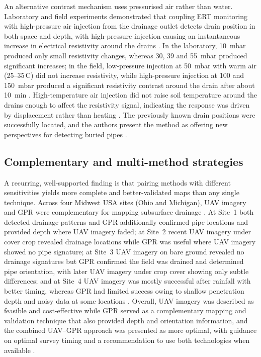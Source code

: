 An alternative contrast mechanism uses pressurised air rather than water. Laboratory and field experiments demonstrated that coupling ERT monitoring with high-pressure air injection from the drainage outlet detects drain position in both space and depth, with high-pressure injection causing an instantaneous increase in electrical resistivity around the drains \parencite{Henine2021}. In the laboratory, 10~mbar produced only small resistivity changes, whereas 30, 39 and 55~mbar produced significant increases; in the field, low-pressure injection at 50~mbar with warm air (25--35\,\textdegree C) did not increase resistivity, while high-pressure injection at 100 and 150~mbar produced a significant resistivity contrast around the drain after about 10~min \parencite{Henine2021}. High-temperature air injection did not raise soil temperature around the drains enough to affect the resistivity signal, indicating the response was driven by displacement rather than heating \parencite{Henine2021}. The previously known drain positions were successfully located, and the authors present the method as offering new perspectives for detecting buried pipes \parencite{Henine2021}.

\subsection{Complementary and multi-method strategies}

A recurring, well-supported finding is that pairing methods with different sensitivities yields more complete and better-validated maps than any single technique. Across four Midwest USA sites (Ohio and Michigan), UAV imagery and GPR were complementary for mapping subsurface drainage \parencite{Koganti2021}. At Site~1 both detected drainage patterns and GPR additionally confirmed pipe locations and provided depth where UAV imagery faded; at Site~2 recent UAV imagery under cover crop revealed drainage locations while GPR was useful where UAV imagery showed no pipe signature; at Site~3 UAV imagery on bare ground revealed no drainage signatures but GPR confirmed the field was drained and determined pipe orientation, with later UAV imagery under crop cover showing only subtle differences; and at Site~4 UAV imagery was mostly successful after rainfall with better timing, whereas GPR had limited success owing to shallow penetration depth and noisy data at some locations \parencite{Koganti2021}. Overall, UAV imagery was described as feasible and cost-effective while GPR served as a complementary mapping and validation technique that also provided depth and orientation information, and the combined UAV--GPR approach was presented as more optimal, with guidance on optimal survey timing and a recommendation to use both technologies when available \parencite{Koganti2021}.

